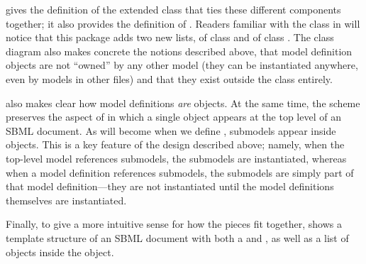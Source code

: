  gives the definition of the extended
\SBML class that ties these different components together; it also
provides the definition of \ExternalModelDefinition.  Readers familiar
with the \SBML class in \sbmlthreecore will notice that this package
adds two new lists,  of class 
\ListOfModelDefinitions and  
of class \ListOfExternalModelDefinitions.  The class diagram
also makes concrete the notions described above, that model definition
objects are not ``owned'' by any other model (they can be instantiated
anywhere, even by models in other files) and that they exist outside the
\Model class entirely.

 also makes clear how model definitions
\emph{are} \Model objects.  At the same time, the scheme preserves the
aspect of \sbmlthreecore in which a single \Model object appears at
the top level of an SBML document.  As will become when we define
\Model, submodels appear inside \Model objects.  This is a key feature
of the design described above; namely, when the top-level model
references submodels, the submodels are instantiated, whereas when a
model definition references submodels, the submodels are simply part of
that model definition---they are not instantiated until the model
definitions themselves are instantiated.

Finally, to give a more intuitive sense for how the pieces fit together,
 shows a template structure of an SBML document
with both a  and
, as well as a list of \Submodel
objects inside the \Model object.

\newcommand{\sayOptional}{\raisebox{0pt}[0pt][0pt]{\bigg\} \textrm{\emph{optional}}}}

